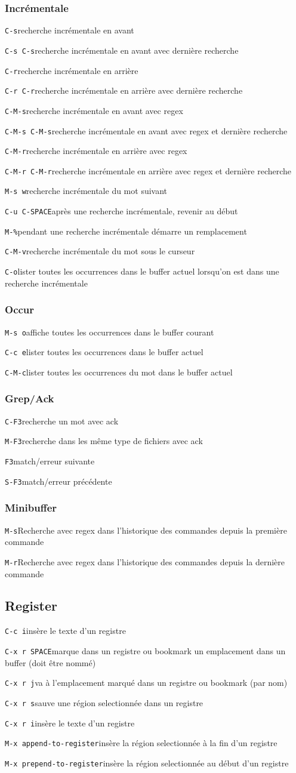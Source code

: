 \documentclass[10pt,landscape]{article}
\def\cm#1#2{{\tt#1}\dotfill#2\par}
\begin{document}
\begin{multicols}{3}
\subsubsection{Incrémentale}
\cm{C-s}{recherche incrémentale en avant}
\cm{C-s C-s}{recherche incrémentale en avant avec dernière recherche}
\cm{C-r}{recherche incrémentale en arrière}
\cm{C-r C-r}{recherche incrémentale en arrière avec dernière recherche}
\cm{C-M-s}{recherche incrémentale en avant avec regex}
\cm{C-M-s C-M-s}{recherche incrémentale en avant avec regex et dernière recherche}
\cm{C-M-r}{recherche incrémentale en arrière avec regex}
\cm{C-M-r C-M-r}{recherche incrémentale en arrière avec regex et dernière recherche}
\cm{M-s w}{recherche incrémentale du mot suivant}
\cm{C-u C-SPACE}{après une recherche incrémentale, revenir au début}
\cm{M-\%}{pendant une recherche incrémentale démarre un remplacement}
\cm{C-M-v}{recherche incrémentale du mot sous le curseur}
\cm{C-o}{lister toutes les occurrences dans le buffer actuel lorsqu'on est dans une recherche incrémentale}

\subsubsection{Occur}
\cm{M-s o}{affiche toutes les occurrences dans le buffer courant}
\cm{C-c e}{lister toutes les occurrences dans le buffer actuel}
\cm{C-M-c}{lister toutes les occurrences du mot dans le buffer actuel}

\subsubsection{Grep/Ack}
\cm{C-F3}{recherche un mot avec ack}
\cm{M-F3}{recherche dans les même type de fichiers avec ack}
\cm{F3}{match/erreur suivante}
\cm{S-F3}{match/erreur précédente}

\subsubsection{Minibuffer}
\cm{M-s}{Recherche avec regex dans l'historique des commandes depuis la première commande}
\cm{M-r}{Recherche avec regex dans l'historique des commandes depuis la dernière commande}





\subsection{Register}
\cm{C-c i}{insère le texte d'un registre}
\cm{C-x r SPACE}{marque dans un registre ou bookmark un emplacement dans un buffer (doit être nommé)}
\cm{C-x r j}{va à l'emplacement marqué dans un registre ou bookmark (par nom)}
\cm{C-x r s}{sauve une région selectionnée dans un registre}
\cm{C-x r i}{insère le texte d'un registre}
\cm{M-x append-to-register}{insère la région selectionnée à la fin d'un registre}
\cm{M-x prepend-to-register}{insère la région selectionnée au début d'un registre}






\end{multicols}
\end{document}
